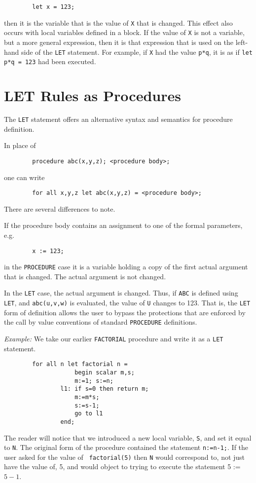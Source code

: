 \begin{verbatim}
        let x = 123;
\end{verbatim}
then it is the variable that is the value of \texttt{X} that is changed.
This effect also occurs with local variables defined in a block.  If the
value of \texttt{X} is not a variable, but a more general expression, then it
is that expression that is used on the left-hand side of the \texttt{LET}
statement.  For example, if \texttt{X} had the value \texttt{p*q}, it is as if
\texttt{let p*q = 123} had been executed.

\section{LET Rules as Procedures}

The \texttt{LET} statement offers an alternative syntax and
semantics for procedure definition.

In place of
\begin{verbatim}
        procedure abc(x,y,z); <procedure body>;
\end{verbatim}
one can write
\begin{verbatim}
        for all x,y,z let abc(x,y,z) = <procedure body>;
\end{verbatim}
There are several differences to note.

If the procedure body contains an assignment to one of the formal
parameters, e.g.
\begin{verbatim}
        x := 123;
\end{verbatim}
in the \texttt{PROCEDURE} case it is a variable holding a copy of the first
actual argument that is changed.  The actual argument is not changed.

In the \texttt{LET} case, the actual argument is changed.  Thus, if \texttt{ABC}
is defined using \texttt{LET}, and \texttt{abc(u,v,w)} is evaluated, the value
of \texttt{U} changes to 123.  That is, the \texttt{LET} form of definition
allows the user to bypass the protections that are enforced by the call
by value conventions of standard \texttt{PROCEDURE} definitions.

\textit{Example:}  We take our earlier \texttt{FACTORIAL}
procedure and write it as a \texttt{LET} statement.
\begin{verbatim}
        for all n let factorial n =
                    begin scalar m,s;
                    m:=1; s:=n;
                l1: if s=0 then return m;
                    m:=m*s;
                    s:=s-1;
                    go to l1
                end;
\end{verbatim}
The reader will notice that we introduced a new local variable, \texttt{S},
and set it equal to \texttt{N}.  The original form of the procedure contained
the statement \texttt{n:=n-1;}.  If the user asked for the value of {\tt
factorial(5)} then \texttt{N} would correspond to, not just have the value
of, 5, and {\REDUCE} would object to trying to execute the statement
5 := $5-1$.

